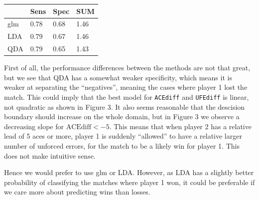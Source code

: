 \documentclass[
]{article}
\begin{document}
\begin{longtable}[]{@{}llll@{}}
\toprule
& Sens & Spec & SUM\tabularnewline
\midrule
\endhead
glm & 0.78 & 0.68 & 1.46\tabularnewline
LDA & 0.79 & 0.67 & 1.46\tabularnewline
QDA & 0.79 & 0.65 & 1.43\tabularnewline
\bottomrule
\end{longtable}

First of all, the performance differences between the methods are not
that great, but we see that QDA has a somewhat weaker specificity, which
means it is weaker at separating the ``negatives'', meaning the cases
where player 1 lost the match. This could imply that the best model for
\texttt{ACEdiff} and \texttt{UFEdiff} is linear, not quadratic as shown
in Figure 3. It also seems reasonable that the descision boundary should
increase on the whole domain, but in Figure 3 we observe a decreasing
slope for \(\text{ACEdiff}< -5\). This means that when player 2 has a
relative lead of 5 aces or more, player 1 is suddenly ``allowed'' to
have a relative larger number of unforced errors, for the match to be a
likely win for player 1. This does not make intuitive sense.

Hence we would prefer to use glm or LDA. However, as LDA has a slightly
better probability of classifying the matches where player 1 won, it
could be preferable if we care more about predicting wins than losses.
\end{document}
